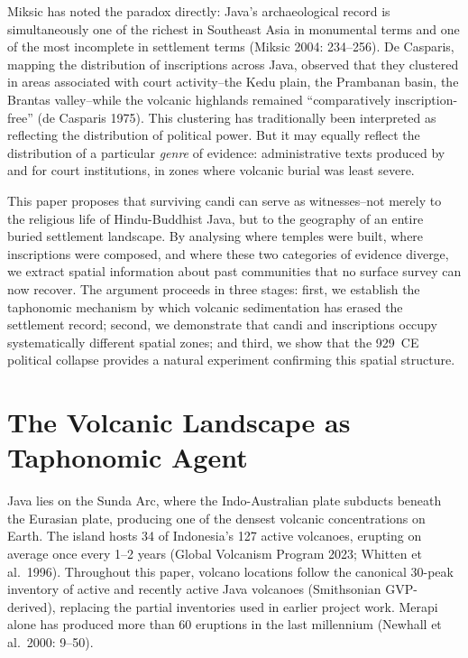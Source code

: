 \documentclass[12pt,a4paper]{article}
\begin{document}
Miksic has noted the paradox directly: Java's archaeological record is simultaneously one of the richest in Southeast Asia in monumental terms and one of the most incomplete in settlement terms (Miksic 2004: 234--256).
De Casparis, mapping the distribution of inscriptions across Java, observed that they clustered in areas associated with court activity--the Kedu plain, the Prambanan basin, the Brantas valley--while the volcanic highlands remained ``comparatively inscription-free'' (de Casparis 1975).
This clustering has traditionally been interpreted as reflecting the distribution of political power.
But it may equally reflect the distribution of a particular \emph{genre} of evidence: administrative texts produced by and for court institutions, in zones where volcanic burial was least severe.

This paper proposes that surviving candi can serve as witnesses--not merely to the religious life of Hindu-Buddhist Java, but to the geography of an entire buried settlement landscape.
By analysing where temples were built, where inscriptions were composed, and where these two categories of evidence diverge, we extract spatial information about past communities that no surface survey can now recover.
The argument proceeds in three stages: first, we establish the taphonomic mechanism by which volcanic sedimentation has erased the settlement record; second, we demonstrate that candi and inscriptions occupy systematically different spatial zones; and third, we show that the 929~CE political collapse provides a natural experiment confirming this spatial structure.

\section{The Volcanic Landscape as Taphonomic Agent}

Java lies on the Sunda Arc, where the Indo-Australian plate subducts beneath the Eurasian plate, producing one of the densest volcanic concentrations on Earth.
The island hosts 34 of Indonesia's 127 active volcanoes, erupting on average once every 1--2 years (Global Volcanism Program 2023; Whitten et al.\ 1996). Throughout this paper, volcano locations follow the canonical 30-peak inventory of active and recently active Java volcanoes (Smithsonian GVP-derived), replacing the partial inventories used in earlier project work.
Merapi alone has produced more than 60 eruptions in the last millennium (Newhall et al.\ 2000: 9--50).
\end{document}
